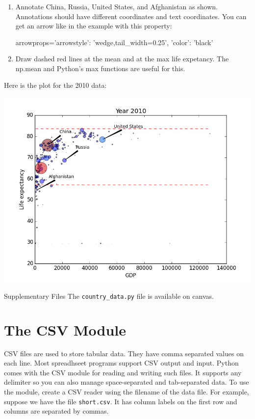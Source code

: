 \documentclass[11pt]{cselabheader}
\begin{document}
\begin{ex}[plotcountries.py]
\begin{enumerate}
\item Annotate China, Russia, United States, and Afghanistan as shown.
Annotations should have different coordinates and text coordinates.
You can get an arrow like in the example with this property:
\begin{python3code}
arrowprops={'arrowstyle': 'wedge,tail_width=0.25', 'color': 'black'}
\end{python3code}

\item Draw dashed red lines at the mean and at the max life expetancy.
The np.mean and Python's max functions are useful for this.
\end{enumerate}

Here is the plot for the 2010 data:
\begin{center}
\includegraphics[width=\textwidth]{img/scatter_2010.png}
\end{center}
\end{ex}

\begin{infobox}{Supplementary Files}
The \texttt{country\_data.py} file is available on canvas.
\end{infobox}

\section{The CSV Module}
CSV files are used to store tabular data. They have comma separated values on
each line. Most spreadhseet programs support CSV output and input. Python comes
with the CSV module for reading and writing such files. It supports any
delimiter so you can also manage space-separated and tab-separated data. To
use the module, create a CSV reader using the filename of the data file. For
example, suppose we have the file \texttt{short.csv}. It has column labels
on the first row and columns are separated by commas.
\end{document}
